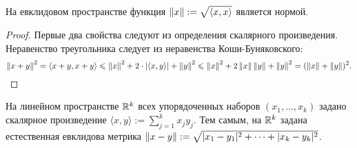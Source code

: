 \documentclass[a4paper]{article}
\theoremstyle{named}
\begin{document}
    \begin{consequence*}
        На евклидовом пространстве функция $\left\lVert x\right\rVert := \sqrt{\langle x, x \rangle}$ является нормой.
    \end{consequence*}

    \begin{proof}
        Первые два свойства следуют из определения скалярного произведения. Неравенство треугольника следует из неравенства Коши-Буняковского:
        \begin{equation*}
            \left\lVert x + y\right\rVert^2 = \langle x + y, x + y \rangle \leqslant \left\lVert x\right\rVert^2 + 2 \cdot |\langle x, y \rangle| + \left\lVert y\right\rVert^2 \leqslant \left\lVert x\right\rVert^2 + 2\left\lVert x\right\rVert\left\lVert y\right\rVert + \left\lVert y\right\rVert^2 = (\left\lVert x\right\rVert + \left\lVert y\right\rVert)^2.
        \end{equation*}
    \end{proof}

    \begin{example*}
        На линейном пространстве $\mathbb{R}^k$ всех упорядоченных наборов $(x_1, \dots, x_k)$ задано скалярное произведение $\langle x, y \rangle := \sum_{j = 1}^k x_jy_j$. Тем самым, на $\mathbb{R}^k$ задана естественная евклидова метрика $\left\lVert x - y\right\rVert := \sqrt{|x_1 - y_1|^2 + \dots + |x_k - y_k|^2}$.
    \end{example*}
\end{document}
